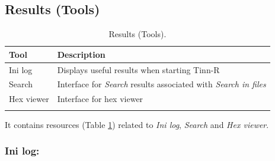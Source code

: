 \hypertarget{working_tools_results}{}
\subsection{Results (Tools)}

\begin{table}
  \begin{footnotesize}
    \begin{tabularx}{\textwidth}{>{\hsize=0.3\hsize}X>{\hsize=0.7\hsize}X}\\
      \hline
      \textbf{Tool} & \textbf{Description} \\
      \hline
      Ini log & Displays useful results when starting Tinn-R \\
      Search & Interface for \textit{Search} results associated with \textit{Search in files} \\
      Hex viewer & Interface for hex viewer \\
      \hline
      \\
    \end{tabularx}
  \end{footnotesize}
  \caption{Results (Tools).}
  \label{tab:tools_results}
\end{table}

It contains resources
(Table \ref{tab:tools_results})
related to \textit{Ini log}, \textit{Search} and \textit{Hex viewer}.


\subsubsection{Ini log:}\\

